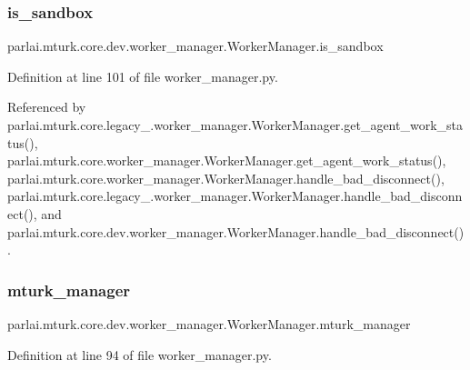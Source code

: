 \subsubsection{\texorpdfstring{is\+\_\+sandbox}{is\_sandbox}}
{\footnotesize\ttfamily parlai.\+mturk.\+core.\+dev.\+worker\+\_\+manager.\+Worker\+Manager.\+is\+\_\+sandbox}



Definition at line 101 of file worker\+\_\+manager.\+py.



Referenced by parlai.\+mturk.\+core.\+legacy\+\_.\+worker\+\_\+manager.\+Worker\+Manager.\+get\+\_\+agent\+\_\+work\+\_\+status(), parlai.\+mturk.\+core.\+worker\+\_\+manager.\+Worker\+Manager.\+get\+\_\+agent\+\_\+work\+\_\+status(), parlai.\+mturk.\+core.\+worker\+\_\+manager.\+Worker\+Manager.\+handle\+\_\+bad\+\_\+disconnect(), parlai.\+mturk.\+core.\+legacy\+\_.\+worker\+\_\+manager.\+Worker\+Manager.\+handle\+\_\+bad\+\_\+disconnect(), and parlai.\+mturk.\+core.\+dev.\+worker\+\_\+manager.\+Worker\+Manager.\+handle\+\_\+bad\+\_\+disconnect().

\mbox{\label{classparlai_1_1mturk_1_1core_1_1dev_1_1worker__manager_1_1WorkerManager_ac998c8103c199cec59f152128f6b876c}} 
\subsubsection{\texorpdfstring{mturk\+\_\+manager}{mturk\_manager}}
{\footnotesize\ttfamily parlai.\+mturk.\+core.\+dev.\+worker\+\_\+manager.\+Worker\+Manager.\+mturk\+\_\+manager}



Definition at line 94 of file worker\+\_\+manager.\+py.



